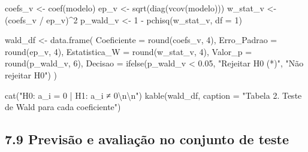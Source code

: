 \documentclass[
  letterpaper,
  DIV=11,
  numbers=noendperiod]{scrartcl}
\newenvironment{Shaded}{\begin{snugshade}}{\end{snugshade}}
\newcommand{\AttributeTok}[1]{\textcolor[rgb]{0.40,0.45,0.13}{#1}}
\newcommand{\DecValTok}[1]{\textcolor[rgb]{0.68,0.00,0.00}{#1}}
\newcommand{\FloatTok}[1]{\textcolor[rgb]{0.68,0.00,0.00}{#1}}
\newcommand{\FunctionTok}[1]{\textcolor[rgb]{0.28,0.35,0.67}{#1}}
\newcommand{\NormalTok}[1]{\textcolor[rgb]{0.00,0.23,0.31}{#1}}
\newcommand{\OtherTok}[1]{\textcolor[rgb]{0.00,0.23,0.31}{#1}}
\newcommand{\SpecialCharTok}[1]{\textcolor[rgb]{0.37,0.37,0.37}{#1}}
\newcommand{\StringTok}[1]{\textcolor[rgb]{0.13,0.47,0.30}{#1}}
\begin{document}
\begin{Shaded}
\begin{Highlighting}[]
\NormalTok{coefs\_v   }\OtherTok{\textless{}{-}} \FunctionTok{coef}\NormalTok{(modelo)}
\NormalTok{ep\_v      }\OtherTok{\textless{}{-}} \FunctionTok{sqrt}\NormalTok{(}\FunctionTok{diag}\NormalTok{(}\FunctionTok{vcov}\NormalTok{(modelo)))}
\NormalTok{w\_stat\_v  }\OtherTok{\textless{}{-}}\NormalTok{ (coefs\_v }\SpecialCharTok{/}\NormalTok{ ep\_v)}\SpecialCharTok{\^{}}\DecValTok{2}
\NormalTok{p\_wald\_v  }\OtherTok{\textless{}{-}} \DecValTok{1} \SpecialCharTok{{-}} \FunctionTok{pchisq}\NormalTok{(w\_stat\_v, }\AttributeTok{df =} \DecValTok{1}\NormalTok{)}

\NormalTok{wald\_df }\OtherTok{\textless{}{-}} \FunctionTok{data.frame}\NormalTok{(}
  \AttributeTok{Coeficiente   =} \FunctionTok{round}\NormalTok{(coefs\_v,   }\DecValTok{4}\NormalTok{),}
  \AttributeTok{Erro\_Padrao   =} \FunctionTok{round}\NormalTok{(ep\_v,      }\DecValTok{4}\NormalTok{),}
  \AttributeTok{Estatistica\_W =} \FunctionTok{round}\NormalTok{(w\_stat\_v,  }\DecValTok{4}\NormalTok{),}
  \AttributeTok{Valor\_p       =} \FunctionTok{round}\NormalTok{(p\_wald\_v,  }\DecValTok{6}\NormalTok{),}
  \AttributeTok{Decisao       =} \FunctionTok{ifelse}\NormalTok{(p\_wald\_v }\SpecialCharTok{\textless{}} \FloatTok{0.05}\NormalTok{, }\StringTok{"Rejeitar H0 (*)"}\NormalTok{, }\StringTok{"Não rejeitar H0"}\NormalTok{)}
\NormalTok{)}

\FunctionTok{cat}\NormalTok{(}\StringTok{"H0: a\_i = 0  |  H1: a\_i ≠ 0}\SpecialCharTok{\textbackslash{}n\textbackslash{}n}\StringTok{"}\NormalTok{)}
\FunctionTok{kable}\NormalTok{(wald\_df, }\AttributeTok{caption =} \StringTok{"Tabela 2. Teste de Wald para cada coeficiente"}\NormalTok{)}
\end{Highlighting}
\end{Shaded}

\subsection{7.9 Previsão e avaliação no conjunto de
teste}\label{previsuxe3o-e-avaliauxe7uxe3o-no-conjunto-de-teste}
\end{document}
